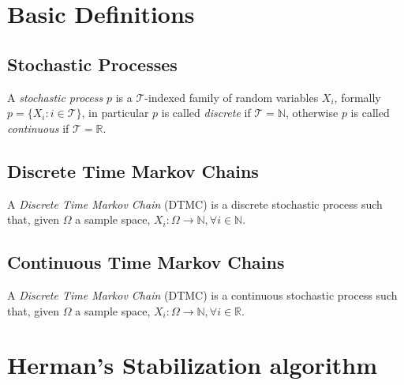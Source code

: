 
\section{Basic Definitions}

\subsection{Stochastic Processes}

A \emph{stochastic process} $p$ is a $\mathcal{T}$-indexed family of
random variables $X_i$, formally $p = \{X_i: i \in \mathcal{T}\}$, in
particular $p$ is called \emph{discrete} if $\mathcal{T} = \mathbb{N}
$, otherwise $p$ is called \emph{continuous} if $\mathcal{T} =
\mathbb{R} $.


\subsection{Discrete Time Markov Chains}

A \emph{Discrete Time Markov Chain} (DTMC) is a discrete stochastic
process such that, given $\Omega$ a sample space, $X_i:\Omega
\rightarrow \mathbb{N}, \forall i\in \mathbb{N} $.

\subsection{Continuous Time Markov Chains}

A \emph{Discrete Time Markov Chain} (DTMC) is a continuous stochastic
process such that, given $\Omega$ a sample space, $X_i:\Omega
\rightarrow \mathbb{N}, \forall i\in \mathbb{R} $.



\section{Herman's Stabilization algorithm}

